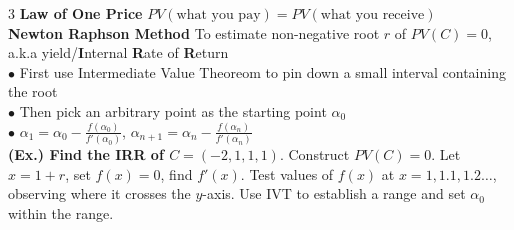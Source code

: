 \documentclass{article}
\begin{document}
{\begin{multicols*}{3}
\textbf{Law of One Price} $PV(\text{what you pay})=PV(\text{what you receive})$\\
\textbf{Newton Raphson Method} To estimate non-negative root $r$ of $PV(C)=0$, a.k.a yield/\textbf{I}nternal \textbf{R}ate of \textbf{R}eturn\\
$\bullet$ First use Intermediate Value Theoreom to pin down a small interval containing the root\\
$\bullet$ Then pick an arbitrary point as the starting point $\alpha_0$\\
$\bullet$ $\alpha_1=\alpha_0-\frac{f(\alpha_0)}{f'(\alpha_0)}$, $\alpha_{n+1}=\alpha_n-\frac{f(\alpha_n)}{f'(\alpha_n)}$\\
\textbf{(Ex.) Find the IRR of $C=(-2,1,1,1)$}. Construct $PV(C)=0$. Let $x=1+r$, set $f(x)=0$, find $f'(x)$. Test values of $f(x)$ at $x=1,1.1,1.2\dots$, observing where it crosses the $y$-axis. Use IVT to establish a range and set $\alpha_0$ within the range.


\end{multicols*}}
\end{document}
